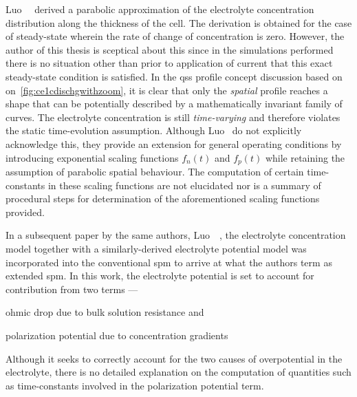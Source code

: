 Luo~\etal~\cite{Luo2013} derived  a parabolic  approximation of  the electrolyte
concentration  distribution along  the  thickness of  the  cell. The  derivation
is  obtained  for  the case  of  steady-state  wherein  the  rate of  change  of
concentration  is  zero.  However,  the  author  of  this  thesis  is  sceptical
about  this   since  in  the   simulations  performed  there  is   no  situation
other  than  prior  to  application  of current  that  this  exact  steady-state
condition is  satisfied. In  the \gls{qss} profile  concept discussion  based on
on~\cref{fig:ce1cdischgwithzoom},  it  is  clear that  only  the  \emph{spatial}
profile reaches  a shape that can  be potentially described by  a mathematically
invariant   family   of  curves.   The   electrolyte   concentration  is   still
\emph{time-varying} and therefore violates the static time-evolution assumption.
Although  Luo~\etal{}  do  not  explicitly acknowledge  this,  they  provide  an
extension for  general operating  conditions by introducing  exponential scaling
functions  $f_n(t)$ and  $f_p(t)$ while  retaining the  assumption of  parabolic
spatial behaviour.  The computation of  certain time-constants in  these scaling
functions  are  not  elucidated  nor  is  a  summary  of  procedural  steps  for
determination of the aforementioned scaling functions provided.


In a subsequent paper by  the same authors, \ie{} Luo~\etal~\cite{Luo2013a}, the
electrolyte concentration  model together  with a  similarly-derived electrolyte
potential model  was incorporated into  the conventional \gls{spm} to  arrive at
what the authors term as extended \gls{spm}. In this work, the electrolyte
potential is set to account for contribution from two terms ---
\begin{enumerate*}[label=\emph{\alph*})]
    \item ohmic drop due to bulk solution resistance and
    \item polarization potential due to concentration gradients
\end{enumerate*}
Although it  seeks to correctly account  for the two causes  of overpotential in
the  electrolyte,  there  is  no  detailed explanation  on  the  computation  of
quantities such as time-constants involved in the polarization potential term.

